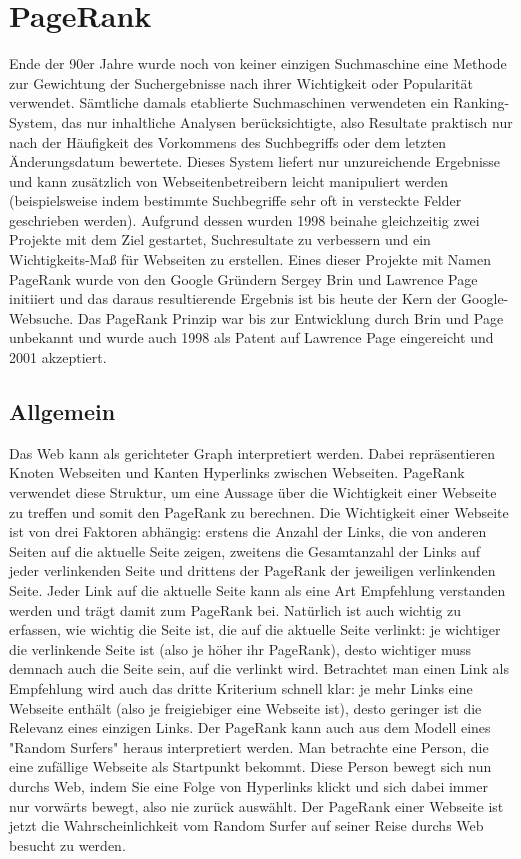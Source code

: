 \documentclass[12pt, a4paper]{llncs}
\begin{document}
	\section{PageRank}
	Ende der 90er Jahre wurde noch von keiner einzigen Suchmaschine eine Methode zur Gewichtung der Suchergebnisse nach ihrer Wichtigkeit oder Popularität verwendet.
	Sämtliche damals etablierte Suchmaschinen verwendeten ein Ranking-System, das nur inhaltliche Analysen berücksichtigte, also Resultate praktisch nur nach der Häufigkeit
	des Vorkommens des Suchbegriffs oder dem letzten Änderungsdatum bewertete. Dieses System liefert nur unzureichende Ergebnisse und kann zusätzlich von Webseitenbetreibern 
	leicht manipuliert werden (beispielsweise indem bestimmte Suchbegriffe sehr oft in versteckte Felder geschrieben werden).\cite{wills06}
	Aufgrund dessen wurden 1998 beinahe gleichzeitig zwei Projekte mit dem Ziel	gestartet, Suchresultate zu verbessern und ein Wichtigkeits-Maß für Webseiten zu erstellen.
	Eines dieser Projekte mit Namen PageRank wurde von den Google Gründern Sergey Brin und Lawrence Page initiiert und das daraus resultierende Ergebnis ist bis heute
	der Kern der Google-Websuche.\cite{langville11}
	Das PageRank Prinzip war bis zur Entwicklung durch Brin und Page unbekannt und wurde auch 1998 als Patent auf Lawrence Page eingereicht und 2001 akzeptiert.\cite{google98}

	\subsection{Allgemein}
	Das Web kann als gerichteter Graph interpretiert werden. Dabei repräsentieren Knoten Webseiten und Kanten Hyperlinks zwischen Webseiten. PageRank verwendet
	diese Struktur, um eine Aussage über die Wichtigkeit einer Webseite zu treffen und somit den PageRank zu berechnen. Die Wichtigkeit einer Webseite ist von drei
	Faktoren abhängig: erstens die Anzahl der Links, die von anderen Seiten auf die aktuelle Seite zeigen, zweitens die Gesamtanzahl der Links auf jeder
	verlinkenden Seite und drittens der PageRank der jeweiligen verlinkenden Seite. Jeder Link auf die aktuelle Seite kann als eine Art Empfehlung verstanden werden
	und trägt damit zum PageRank bei. Natürlich ist auch wichtig zu erfassen, wie wichtig die Seite ist, die auf die aktuelle Seite verlinkt: je wichtiger die
	verlinkende Seite ist (also je höher ihr PageRank), desto wichtiger muss demnach auch die Seite sein, auf die verlinkt wird. Betrachtet man einen Link als
	Empfehlung wird auch das dritte Kriterium schnell klar: je mehr Links eine Webseite enthält (also je freigiebiger eine Webseite ist), desto geringer ist die
	Relevanz eines einzigen Links.\cite{langville11}
	Der PageRank kann auch aus dem Modell eines "Random Surfers" heraus interpretiert werden. Man betrachte eine Person, die eine zufällige Webseite als Startpunkt
	bekommt. Diese Person bewegt sich nun durchs Web, indem Sie eine Folge von Hyperlinks klickt und sich dabei immer nur vorwärts bewegt, also nie zurück auswählt.
	Der PageRank einer Webseite ist jetzt die Wahrscheinlichkeit vom Random Surfer auf seiner Reise durchs Web besucht zu werden.\cite{page98}
	
\end{document}
